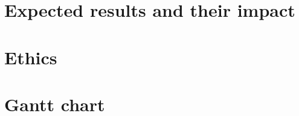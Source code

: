 \documentclass[a4paper,11pt]{article}
\begin{document}
\section{Expected results and their impact}

\section{Ethics}

\section{Gantt chart}


	
	

\clearpage
	
	
	
	
\end{document}
